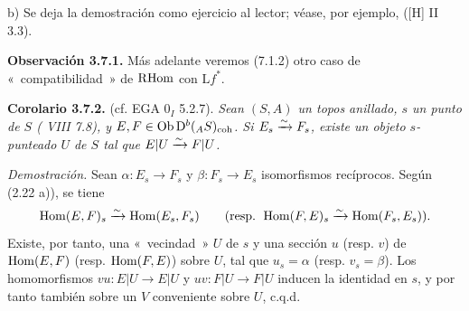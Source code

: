 b) Se deja la demostración como ejercicio al lector; véase, por ejemplo, ([H] II 3.3).

\textbf{Observación 3.7.1.} Más adelante veremos (7.1.2) otro caso de «~compatibilidad~» de \(\mathrm R\!\operatorname{Hom}\) con \(\mathrm Lf^*\).

\textbf{Corolario 3.7.2.} (cf. EGA \(0_I\) 5.2.7). \emph{Sean \((S,A)\) un topos anillado, \(s\) un punto de \(S\) ( VIII 7.8), y \(E,F\in\operatorname{Ob}\mathrm D^b(_A S)_{\mathrm{coh}}\). Si \(E_s\xrightarrow{\sim} F_s\), existe un objeto \(s\)-punteado \(U\) de \(S\) tal que \(E|U\xrightarrow{\sim} F|U\).}

\emph{Demostración.} Sean \(\alpha:E_s\to F_s\) y \(\beta:F_s\to E_s\) isomorfismos recíprocos. Según (2.22 a)), se tiene
\[
  \operatorname{Hom}(E,F)_s\xrightarrow{\sim}\operatorname{Hom}(E_s,F_s)
  \qquad
  (\text{resp. }\operatorname{Hom}(F,E)_s\xrightarrow{\sim}\operatorname{Hom}(F_s,E_s)).
\]
Existe, por tanto, una «~vecindad~» \(U\) de \(s\) y una sección \(u\) (resp. \(v\)) de \(\operatorname{Hom}(E,F)\) (resp. \(\operatorname{Hom}(F,E)\)) sobre \(U\), tal que \(u_s=\alpha\) (resp. \(v_s=\beta\)). Los homomorfismos \(vu:E|U\to E|U\) y \(uv:F|U\to F|U\) inducen la identidad en \(s\), y por tanto también sobre un \(V\) conveniente sobre \(U\), c.q.d.
